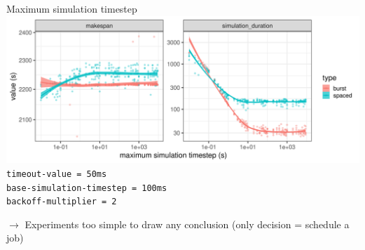\documentclass[12pt, aspectratio=43]{beamer}
\begin{document}
\begin{frame}{Maximum simulation timestep}
	\includegraphics[width=\textwidth]{../imgs/max-timestep_burst_sp.png}
	{\small \texttt{timeout-value = 50ms}\\
	\texttt{base-simulation-timestep = 100ms}\\
	\texttt{backoff-multiplier = 2}}

	$\rightarrow$ Experiments too simple to draw any conclusion (only decision = schedule a job)
\end{frame}
\end{document}
